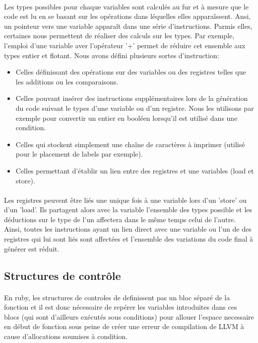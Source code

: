 \documentclass[12pt]{article}
\begin{document}
\paragraph{} Les types possibles pour chaque variables sont calculés au fur et à mesure que
le code est lu en se basant sur les opérations dans léquelles elles
apparaîssent. Ansi, un pointeur vers une variable apparaît dans une série
d'instructions. Parmis elles, certaines nous permettent de réaliser des
calculs sur les types. Par exemple, l'emploi d'une variable aver l'opérateur
'+' permet de réduire cet ensemble aux types entier et flotant. Nous avons défini plusieurs sortes d'instruction:
\begin{itemize}
	\item Celles définissant des opérations sur des variables ou des registres
		telles que les additions ou les comparaisons.
	\item Celles pouvant insérer des instructions supplémentaires lors de la
		génération du code suivant le types d'une variable ou d'un registre.
		Nous les utilisons par exemple pour convertir un entier en booléen
		lorsqu'il est utilisé dans une condition.
	\item Celles qui stockent simplement une chaîne de caractères à imprimer
		(utilisé pour le placement de labels par exemple).
	\item Celles permettant d'établir un lien entre des registres et une
		variables (load et store).
\end{itemize}

\paragraph{} Les registres peuvent être liés une unique fois à une variable
lors d'un 'store' ou d'un 'load'. Ils partagent alors avec la variable
l'ensemble des types possible et les déductions sur le type de l'un affectera
dans le même temps celui de l'autre. Ainsi, toutes les instructions ayant un
lien direct avec une variable ou l'un de des registres qui lui sont liés sont
affectées et l'ensemble des variations du code final à générer est réduit.

\subsection{Structures de contrôle}

\paragraph{} En ruby, les structures de controles de definissent pas un bloc séparé de la fonction et il est donc nécessaire de repérer les variables introduites dans ces blocs (qui sont d'ailleurs exécutés sous conditions) pour allouer l'espace necessaire en début de fonction sous peine de créer une erreur de compilation de LLVM à cause d'allocations soumises à condition.
\end{document}

